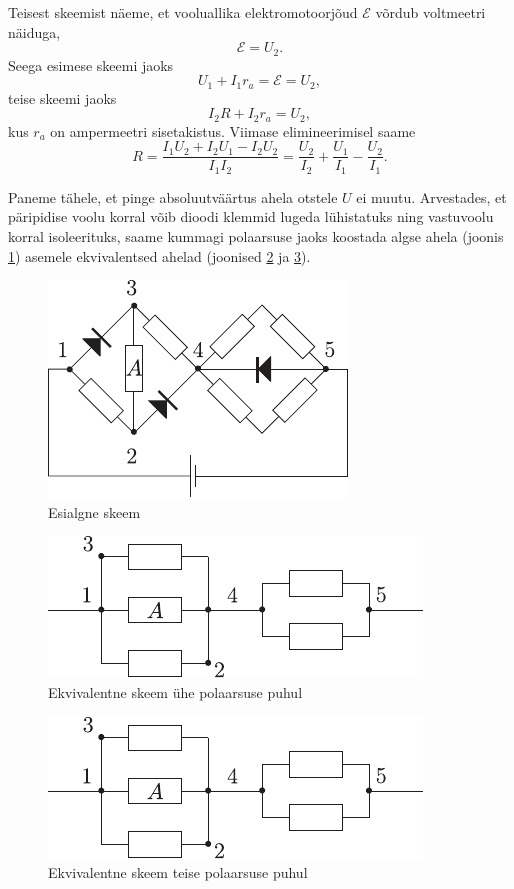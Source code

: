 \documentclass[10pt]{article}
\begin{document}
{
\solu
Teisest skeemist näeme, et vooluallika elektromotoorjõud $\mathcal E$ võrdub voltmeetri näiduga,
\[
\mathcal E = U_2.
\]
Seega esimese skeemi jaoks
\[
U_1 + I_1r_a = \mathcal E = U_2,
\]
teise skeemi jaoks
\[
I_2R + I_2r_a = U_2,
\]
kus $r_a$ on ampermeetri sisetakistus. Viimase elimineerimisel saame
\[
R=\frac{I_{1} U_{2}+I_{2} U_{1}-I_{2} U_{2}}{I_{1} I_{2}}=\frac{U_{2}}{I_{2}}+\frac{U_{1}}{I_{1}}-\frac{U_{2}}{I_{1}}.
\]
\probend
\bigskip


\solu
Paneme tähele, et pinge absoluutväärtus ahela otstele $U$ ei muutu. Arvestades, et päripidise voolu korral võib dioodi klemmid lugeda lühistatuks ning vastuvoolu korral isoleerituks, saame kummagi polaarsuse jaoks koostada algse ahela (joonis \ref{2005-v3g-04:fig1}) asemele ekvivalentsed ahelad (joonised \ref{2005-v3g-04:fig2} ja \ref{2005-v3g-04:fig3}).

\begin{figure}[h]
	\centering
	\includegraphics[width=0.6\linewidth]{2005-v3g-04-lah1}
	\caption{Esialgne skeem}
	\label{2005-v3g-04:fig1}
\end{figure}
\begin{figure}[h]
	\centering
	\includegraphics[width=0.6\linewidth]{2005-v3g-04-lah2}
	\caption{Ekvivalentne skeem ühe polaarsuse puhul}
	\label{2005-v3g-04:fig2}
\end{figure}
\begin{figure}[h]
	\centering
	\includegraphics[width=0.6\linewidth]{2005-v3g-04-lah2}
	\caption{ Ekvivalentne skeem teise polaarsuse puhul}
	\label{2005-v3g-04:fig3}
\end{figure}

}
\end{document}
